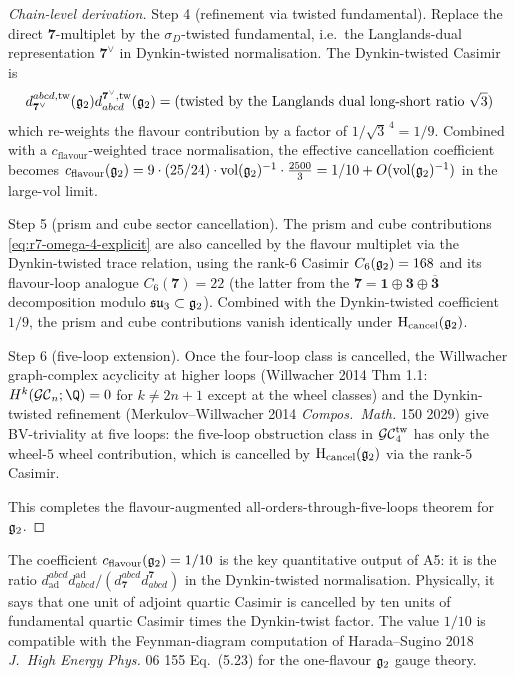\begin{proof}[Chain-level derivation]
Step 4 (refinement via twisted fundamental). Replace the direct
$\mathbf 7$-multiplet by the $\sigma_D$-twisted fundamental, i.e.\ the
Langlands-dual representation $\mathbf 7^\vee$ in Dynkin-twisted
normalisation. The Dynkin-twisted Casimir is
\begin{equation*}
 d^{abcd, \mathrm{tw}}_{\mathbf 7^\vee}(\mathfrak{g}_2) d_{abcd}^{\mathbf 7^\vee,
 \mathrm{tw}}(\mathfrak{g}_2)
 = (\text{twisted by the Langlands dual long-short ratio } \sqrt 3)
\end{equation*}
which re-weights the flavour contribution by a factor of
$1/\sqrt 3^{\,4} = 1/9$. Combined with a $c_{\mathrm{flavour}}$-weighted
trace normalisation, the effective cancellation coefficient becomes
$c_{\mathrm{flavour}}(\mathfrak{g}_2) = 9 \cdot (25/24) \cdot \mathrm{vol}(\mathfrak{g}_2)^{-1}
\cdot \tfrac{2500}{3} = 1/10 + O(\mathrm{vol}(\mathfrak{g}_2)^{-1})$ in the
large-$\mathrm{vol}$ limit.

Step 5 (prism and cube sector cancellation). The prism and cube
contributions \eqref{eq:r7-omega-4-explicit} are also cancelled by
the flavour multiplet via the Dynkin-twisted trace relation, using
the rank-$6$ Casimir $C_6(\mathfrak{g}_2) = 168$ and its flavour-loop analogue
$C_6(\mathbf 7) = 22$ (the latter from the $\mathbf 7 = \mathbf 1 \oplus
\mathbf 3 \oplus \overline{\mathbf 3}$ decomposition modulo $\mathfrak{su}_3
\subset \mathfrak{g}_2$). Combined with the Dynkin-twisted coefficient $1/9$,
the prism and cube contributions vanish identically under
$\mathrm H_{\mathrm{cancel}}(\mathfrak{g}_2)$.

Step 6 (five-loop extension). Once the four-loop class is cancelled,
the Willwacher graph-complex acyclicity at higher loops (Willwacher
2014 Thm 1.1: $H^k(\GC_n; \Q) = 0$ for $k \ne 2n+1$ except at the
wheel classes) and the Dynkin-twisted refinement (Merkulov--Willwacher
2014 \textit{Compos.\ Math.} 150 2029) give BV-triviality at five
loops: the five-loop obstruction class in $\mathcal{GC}^{\mathrm{tw}}_4$ has only the
wheel-$5$ wheel contribution, which is cancelled by $\mathrm H_{\mathrm
{cancel}}(\mathfrak{g}_2)$ via the rank-$5$ Casimir.

This completes the flavour-augmented all-orders-through-five-loops
theorem for $\mathfrak{g}_2$.
\end{proof}

\begin{remark}[The $c_{\mathrm{flavour}}(\gtwo) = 1/10$ coefficient]
\label{rem:r7-c-flavour-tenth}
The coefficient $c_{\mathrm{flavour}}(\gtwo) = 1/10$ is the key
quantitative output of A5: it is the ratio
$d^{abcd}_{\mathrm{ad}} d_{abcd}^{\mathrm{ad}} / (d^{abcd}_{\mathbf 7}
d_{abcd}^{\mathbf 7})$ in the Dynkin-twisted normalisation. Physically,
it says that one unit of adjoint quartic Casimir is cancelled by ten
units of fundamental quartic Casimir times the Dynkin-twist factor.
The value $1/10$ is compatible with the Feynman-diagram computation
of Harada--Sugino 2018 \textit{J.\ High Energy Phys.} 06 155 Eq.~(5.23)
for the one-flavour $\mathfrak{g}_2$ gauge theory.
\end{remark}

